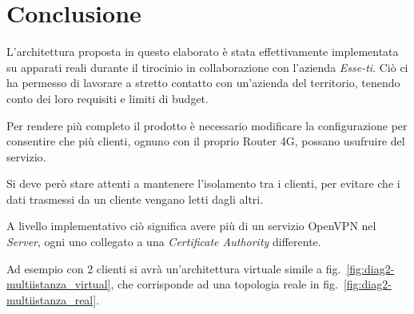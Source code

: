 \chapter{Conclusione \workinprogress}

L'architettura proposta in questo elaborato è stata effettivamente implementata su apparati reali durante il tirocinio in collaborazione con l'azienda \textit{Esse-ti}. Ciò ci ha permesso di lavorare a stretto contatto con un'azienda del territorio, tenendo conto dei loro requisiti e limiti di budget.




\todo[da riscrivere]
Per rendere più completo il prodotto è necessario modificare la configurazione per consentire che più clienti, ognuno con il proprio Router 4G, possano usufruire del servizio. 


Si deve però stare attenti a mantenere l'isolamento tra i clienti, per evitare che i dati trasmessi da un cliente vengano letti dagli altri.



A livello implementativo ciò significa avere più di un servizio OpenVPN nel \textit{Server}, ogni uno collegato a una \textit{Certificate Authority} differente.

Ad esempio con 2 clienti si avrà un'architettura virtuale simile a fig.~\ref{fig:diag2-multiistanza_virtual}, che corrisponde ad una topologia reale in fig.~\ref{fig:diag2-multiistanza_real}.

